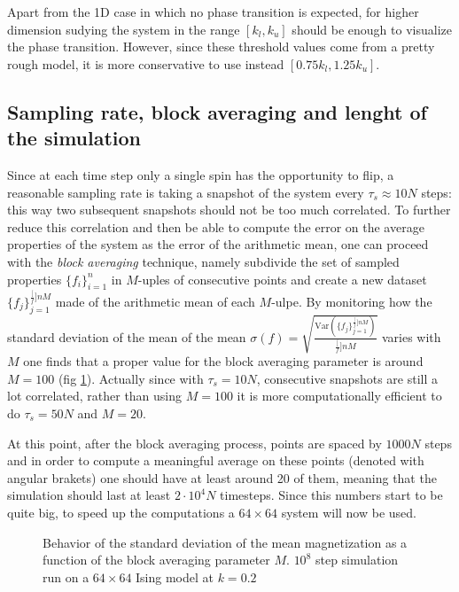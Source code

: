 \documentclass[a4paper, 11pt]{article}
\begin{document}
      Apart from the 1D case in which no phase transition is expected, for higher dimension sudying the system in the range $[k_l,k_u]$ should be enough to visualize the phase transition. However, since these threshold values come from a pretty rough model, it is more conservative to use instead $[0.75k_l,1.25k_u]$.


    \subsection{Sampling rate, block averaging and lenght of the simulation}
      Since at each time step only a single spin has the opportunity to flip, a reasonable sampling rate is taking a snapshot of the system every $\tau_s \approx 10N$ steps: this way two subsequent snapshots should not be too much correlated. To further reduce this correlation and then be able to compute the error on the average properties of the system as the error of the arithmetic mean, one can proceed with the \emph{block averaging} technique, namely subdivide the set of sampled properties $\{f_i\}_{i=1}^n$ in $M$-uples of consecutive points and create a new dataset $\{f_j\}_{j=1}^{\frac[f]{n}{M}}$ made of the arithmetic mean of each $M$-ulpe.
      By monitoring how the standard deviation of the mean of the mean $\sigma(f) = \sqrt{\frac{\text{Var}\left( \{f_j\}_{j=1}^{\frac[f]{n}{M}} \right)}{\frac[f]{n}{M}}}$ varies with $M$ one finds that a proper value for the block averaging parameter is around $M = 100$ (fig \ref{fig:block_averaging}).
      Actually since with $\tau_s = 10N$, consecutive snapshots are still a lot correlated, rather than using $M = 100$ it is more computationally efficient to do $\tau_s = 50N$ and $M = 20$.


      At this point, after the block averaging process, points are spaced by $1000 N$ steps and in order to compute a meaningful average on these points (denoted with angular brakets) one should have at least around 20 of them, meaning that the simulation should last at least $2\cdot10^4 N$ timesteps.
      Since this numbers start to be quite big, to speed up the computations a $64\times64$ system will now be used.

      \begin{figure}[H]
        \centering
        \caption{Behavior of the standard deviation of the mean magnetization as a function of the block averaging parameter $M$. $10^8$ step simulation run on a $64\times64$ Ising model at $k = 0.2$}
        \label{fig:block_averaging}
      \end{figure}
\end{document}
